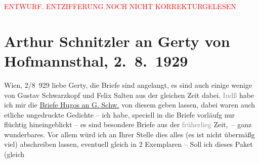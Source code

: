 
\begin{center}
            \textcolor{red}{ENTWURF. ENTZIFFERUNG NOCH NICHT KORREKTURGELESEN}
                      \end{center}
            
               \section[Arthur Schnitzler an Gerty von Hofmannsthal, 2. 8. 1929]{ Arthur Schnitzler an Gerty von Hofmannsthal, 2. 8. 1929}\nopagebreak{}\rehead{ }\begin{ledgroupsized}[t]{13cm}\normalsize\beginnumbering{} \toendnotes[C]{\smallbreak\pagebreak[2]} 
\pstart
           \raggedleft{}{\pb}Wien, 2/8 929\pend
           \pstart
           liebe Gerty, die Briefe sind angelangt, es sind auch einige wenige
               von Gustav Schwarzkopf und Felix Salten aus der gleichen Zeit dabei. \textcolor{gray}{Indß}
               habe ich mir die \uline{Briefe Hugos an G. Schw.} von diesem geben lassen, dabei waren auch etliche ungedruckte Gedichte – ich
               habe, speciell in die Briefe vorläufg nur flüchtig hineingeblickt – es sind besondere
               Briefe aus der \textcolor{gray}{früherlieg} Zeit, – ganz wunderbares. Vor allem würd
               ich \introOben{}an Ihrer Stelle\introOben{} dies alles (es ist nicht übermäßg viel)
               abschreiben lassen, eventuell gleich in 2 Exemplaren – Soll ich dieses Paket (gleich

\end{ledgroupsized}
